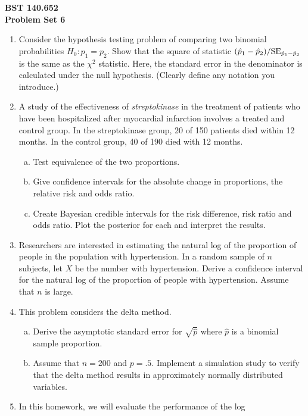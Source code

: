 \documentclass[12pt]{article}
\begin{document}
\noindent
{\bf BST 140.652 \\ Problem Set 6} \\

\begin{enumerate}[Problem 1.]
\item Consider the hypothesis testing problem of comparing two
  binomial probabilities $H_0: p_1 = p_2$.  Show that the square of
  statistic $(\hat{p}_1 - \hat{p}_2)/{\rm SE}_{\hat{p}_1 - \hat{p}_2}$
  is the same as the $\chi^2$ statistic. Here, the standard error in
  the denominator is calculated under the null hypothesis. (Clearly
  define any notation you introduce.)
\item A study of the effectiveness of {\sl streptokinase} in the
  treatment of patients who have been hospitalized after myocardial
  infarction involves a treated and control group.  In the
  streptokinase group, 20 of 150 patients died within 12 months.  In the
  control group, 40 of 190 died with 12 months.
  \begin{enumerate}[a.]
  \item Test equivalence of the two proportions.
  \item Give confidence intervals for the absolute change in proportions, the relative risk and odds ratio.  
  \item Create Bayesian credible intervals for the risk difference,
    risk ratio and odds ratio. Plot the posterior for each and
    interpret the results.
  \end{enumerate}
\item Researchers are interested in estimating the natural log of the
  proportion of people in the population with hypertension. In a
  random sample of $n$ subjects, let $X$ be the number with
  hypertension. Derive a confidence interval for the natural log of the
  proportion of people with hypertension. Assume that $n$ is
  large. 
\item This problem considers the delta method.
  \begin{enumerate}[a.]
  \item Derive the asymptotic standard error for $\sqrt{\hat p}$
    where $\hat p$ is a binomial sample proportion.
  \item Assume that $n = 200$ and $p = .5$. Implement a simulation
    study to verify that the delta method results in approximately
    normally distributed variables.
  \end{enumerate}
\item In this homework, we will evaluate the performance of the log

\end{enumerate}
\end{document}
